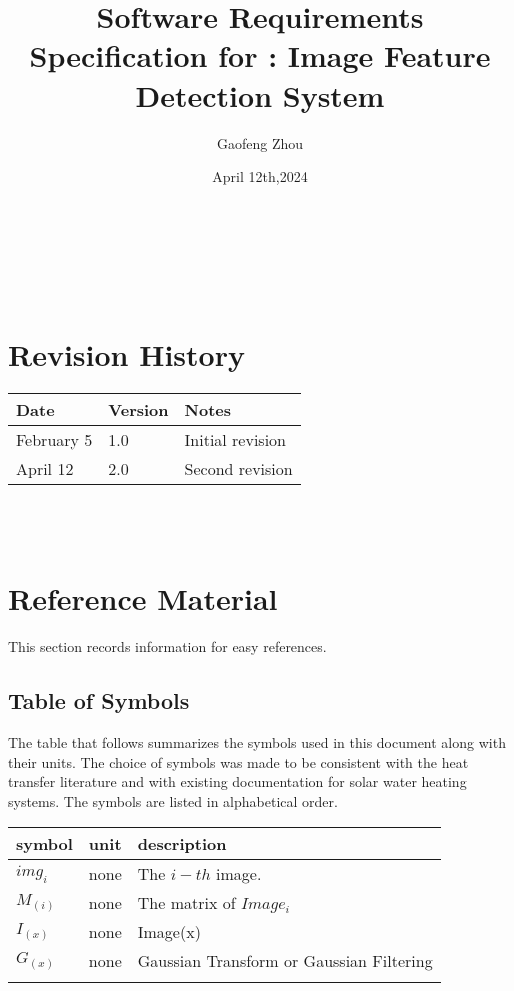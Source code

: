 \documentclass[12pt]{article}
\begin{document}
\title{Software Requirements Specification for \progname: Image Feature Detection System} 
\author{Gaofeng Zhou}
\date{April 12th,2024}
	
\maketitle

~\newpage


\tableofcontents

~\newpage

\section*{Revision History}

\begin{tabularx}{\textwidth}{p{3cm}p{2cm}X}
\toprule {\bf Date} & {\bf Version} & {\bf Notes}\\
\midrule
February 5 & 1.0 & Initial  revision \\
April 12 & 2.0& Second revision\\
\bottomrule
\end{tabularx}

~\\


~\newpage

\section{Reference Material}
This section records information for easy references.

\subsection{Table of Symbols}

The table that follows summarizes the symbols used in this document along with
their units.  The choice of symbols was made to be consistent with the heat
transfer literature and with existing documentation for solar water heating
systems.  The symbols are listed in alphabetical order.

\renewcommand{\arraystretch}{1.2}
\noindent \begin{longtable*}{l l p{12cm}} \toprule
\textbf{symbol} & \textbf{unit} & \textbf{description}\\
\midrule 
$img_i$ & none & The $i-th$ image.
\\
$M_(i)$ & none & The matrix of $Image_i $\\
$I_(x)$ & none &Image(x)\\
$G_(x)$ &none  &Gaussian Transform or Gaussian Filtering\\

\\ 
\bottomrule
\end{longtable*}
\end{document}
